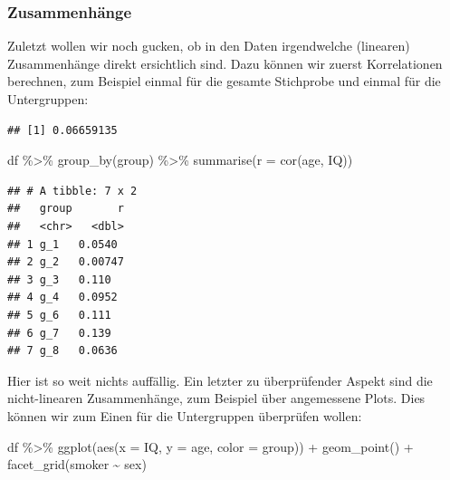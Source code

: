 \documentclass[
]{book}
\newenvironment{Shaded}{\begin{snugshade}}{\end{snugshade}}
\newcommand{\AttributeTok}[1]{\textcolor[rgb]{0.77,0.63,0.00}{#1}}
\newcommand{\FunctionTok}[1]{\textcolor[rgb]{0.00,0.00,0.00}{#1}}
\newcommand{\NormalTok}[1]{#1}
\newcommand{\SpecialCharTok}[1]{\textcolor[rgb]{0.00,0.00,0.00}{#1}}
\begin{document}
\hypertarget{zusammenhuxe4nge}{%
\subsubsection{Zusammenhänge}\label{zusammenhuxe4nge}}

Zuletzt wollen wir noch gucken, ob in den Daten irgendwelche (linearen) Zusammenhänge direkt ersichtlich sind. Dazu können wir zuerst Korrelationen berechnen, zum Beispiel einmal für die gesamte Stichprobe und einmal für die Untergruppen:

\begin{Shaded}
\end{Shaded}

\begin{verbatim}
## [1] 0.06659135
\end{verbatim}

\begin{Shaded}
\begin{Highlighting}[]
\NormalTok{df }\SpecialCharTok{\%\textgreater{}\%} 
  \FunctionTok{group\_by}\NormalTok{(group) }\SpecialCharTok{\%\textgreater{}\%} 
  \FunctionTok{summarise}\NormalTok{(}\AttributeTok{r =} \FunctionTok{cor}\NormalTok{(age, IQ))}
\end{Highlighting}
\end{Shaded}

\begin{verbatim}
## # A tibble: 7 x 2
##   group       r
##   <chr>   <dbl>
## 1 g_1   0.0540 
## 2 g_2   0.00747
## 3 g_3   0.110  
## 4 g_4   0.0952 
## 5 g_6   0.111  
## 6 g_7   0.139  
## 7 g_8   0.0636
\end{verbatim}

Hier ist so weit nichts auffällig. Ein letzter zu überprüfender Aspekt sind die nicht-linearen Zusammenhänge, zum Beispiel über angemessene Plots. Dies können wir zum Einen für die Untergruppen überprüfen wollen:

\begin{Shaded}
\begin{Highlighting}[]
\NormalTok{df }\SpecialCharTok{\%\textgreater{}\%} 
  \FunctionTok{ggplot}\NormalTok{(}\FunctionTok{aes}\NormalTok{(}\AttributeTok{x =}\NormalTok{ IQ, }
             \AttributeTok{y =}\NormalTok{ age, }
             \AttributeTok{color =}\NormalTok{ group)) }\SpecialCharTok{+}
  \FunctionTok{geom\_point}\NormalTok{() }\SpecialCharTok{+}
  \FunctionTok{facet\_grid}\NormalTok{(smoker }\SpecialCharTok{\textasciitilde{}}\NormalTok{ sex)}
\end{Highlighting}
\end{Shaded}
\end{document}
